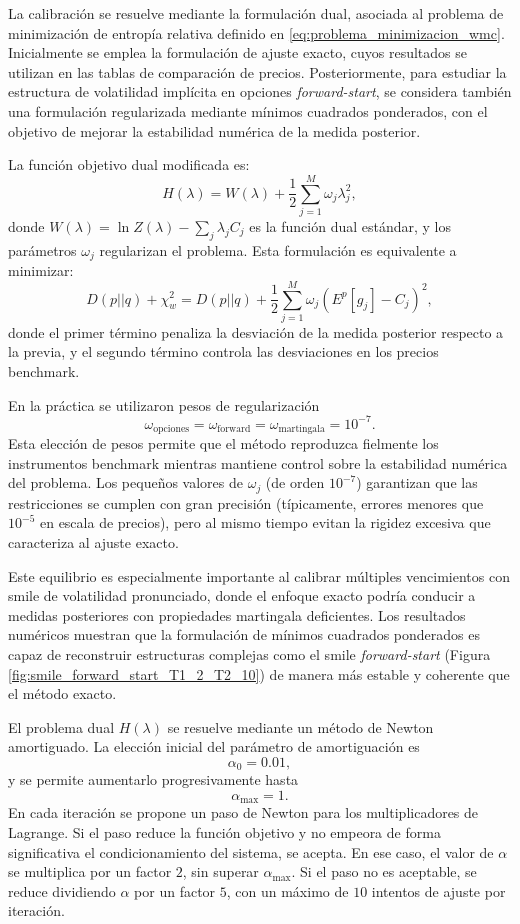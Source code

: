 La calibración se resuelve mediante la formulación dual, asociada al problema de minimización de entropía relativa definido en \ref{eq:problema_minimizacion_wmc}. Inicialmente se emplea la formulación de ajuste exacto, cuyos resultados se utilizan en las tablas de comparación de precios. Posteriormente, para estudiar la estructura de volatilidad implícita en opciones \textit{forward-start}, se considera también una formulación regularizada mediante mínimos cuadrados ponderados, con el objetivo de mejorar la estabilidad numérica de la medida posterior.\medskip

La función objetivo dual modificada es:
\[
H(\lambda) = W(\lambda) + \frac{1}{2}\sum_{j=1}^{M}\omega_j\lambda_j^2,
\]
donde \(W(\lambda) = \ln Z(\lambda) - \sum_j \lambda_j C_j\) es la función dual estándar, y los parámetros \(\omega_j\) regularizan el problema. Esta formulación es equivalente a minimizar:
\[
D(p||q) + \chi^2_w = D(p||q) + \frac{1}{2}\sum_{j=1}^{M}\omega_j\left(E^p[g_j] - C_j\right)^2,
\]
donde el primer término penaliza la desviación de la medida posterior respecto a la previa, y el segundo término controla las desviaciones en los precios benchmark.

En la práctica se utilizaron pesos de regularización
\[
\omega_{\mathrm{opciones}}
=
\omega_{\mathrm{forward}}
=
\omega_{\mathrm{martingala}}
=
10^{-7}.
\]
Esta elección de pesos permite que el método reproduzca fielmente los instrumentos benchmark mientras mantiene control sobre la estabilidad numérica del problema. Los pequeños valores de \(\omega_j\) (de orden \(10^{-7}\)) garantizan que las restricciones se cumplen con gran precisión (típicamente, errores menores que \(10^{-5}\) en escala de precios), pero al mismo tiempo evitan la rigidez excesiva que caracteriza al ajuste exacto.\medskip

Este equilibrio es especialmente importante al calibrar múltiples vencimientos con smile de volatilidad pronunciado, donde el enfoque exacto podría conducir a medidas posteriores con propiedades martingala deficientes. Los resultados numéricos muestran que la formulación de mínimos cuadrados ponderados es capaz de reconstruir estructuras complejas como el smile \textit{forward-start} (Figura \ref{fig:smile_forward_start_T1_2_T2_10}) de manera más estable y coherente que el método exacto.\medskip

El problema dual \(H(\lambda)\) se resuelve mediante un método de Newton amortiguado. La elección inicial del parámetro de amortiguación es
\[
\alpha_0=0.01,
\]
y se permite aumentarlo progresivamente hasta
\[
\alpha_{\max}=1.
\]
En cada iteración se propone un paso de Newton para los multiplicadores de Lagrange. Si el paso reduce la función objetivo y no empeora de forma significativa el condicionamiento del sistema, se acepta. En ese caso, el valor de \(\alpha\) se multiplica por un factor \(2\), sin superar \(\alpha_{\max}\). Si el paso no es aceptable, se reduce dividiendo \(\alpha\) por un factor \(5\), con un máximo de \(10\) intentos de ajuste por iteración.\medskip

